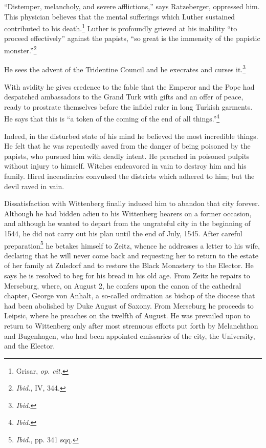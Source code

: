 “Distemper, melancholy, and severe afflictions,” says Ratzeberger,
oppressed him. This physician believes that the mental sufferings
which Luther sustained contributed to his death.\footnote{Grisar, \textit{op. cit.}}
 Luther is profoundly
grieved at his inability “to proceed effectively” against the
papists, “so great is the immensity of the papistic monster.”\footnote{\textit{Ibid.}, IV, 344.}

He sees the advent of the Tridentine Council and he execrates and curses
it.\footnote{\textit{Ibid.}}

With avidity he gives credence to the fable that the Emperor and
the Pope had despatched ambassadors to the Grand Turk with gifts
and an offer of peace, ready to prostrate themselves before the infidel
ruler in long Turkish garments. He says that this is “a token of
the coming of the end of all things.”\footnote{\textit{Ibid.}}

Indeed, in the disturbed
state of his mind he believed the most incredible things. He felt that
he was repeatedly saved from the danger of being poisoned by the
papists, who pursued him with deadly intent. He preached in poisoned
pulpits without injury to himself. Witches endeavored in vain to
destroy him and his family. Hired incendiaries convulsed the districts
which adhered to him; but the devil raved in vain.

Dissatisfaction with Wittenberg finally induced him to abandon
that city forever. Although he had bidden adieu to his Wittenberg
hearers on a former occasion, and although he wanted to depart from
the ungrateful city in the beginning of 1544, he did not carry out
his plan until the end of July, 1545. After careful preparation\footnote{\textit{Ibid.}, pp. 341 sqq.}
 he
betakes himself to Zeitz, whence he addresses a letter to his wife, declaring
that he will never come back and requesting her to return to
the estate of her family at Zulsdorf and to restore the Black Monastery
to the Elector. He says he is resolved to beg for his bread in his old
age. From Zeitz he repairs to Merseburg, where, on August 2, he confers
upon the canon of the cathedral chapter, George von Anhalt, a
so-called ordination as bishop of the diocese that had been abolished
by Duke August of Saxony. From Merseburg he proceeds to Leipsic,
where he preaches on the twelfth of August. He was prevailed upon
to return to Wittenberg only after most strenuous efforts put forth
by Melanchthon and Bugenhagen, who had been appointed emissaries
of the city, the University, and the Elector.

